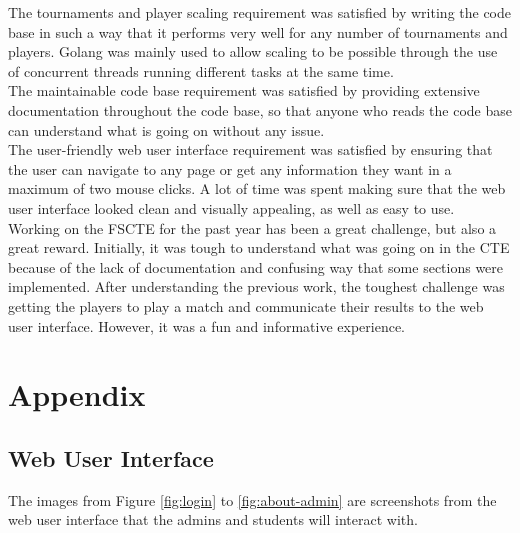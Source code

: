 \documentclass[a4paper, 12pt]{report}
\begin{document}
The tournaments and player scaling requirement was satisfied by writing the
code base in such a way that it performs very well for any number of tournaments
and players. Golang was mainly used to allow scaling to be possible through the
use of concurrent threads running different tasks at the same time. \\

The maintainable code base requirement was satisfied by providing extensive
documentation throughout the code base, so that anyone who reads the code base
can understand what is going on without any issue. \\

The user-friendly web user interface requirement was satisfied by ensuring that
the user can navigate to any page or get any information they want in a maximum
of two mouse clicks. A lot of time was spent making sure that the web user
interface looked clean and visually appealing, as well as easy to use. \\

Working on the FSCTE for the past year has been a great challenge, but also a
great reward. Initially, it was tough to understand what was going on in the CTE
because of the lack of documentation and confusing way that some sections were
implemented. After understanding the previous work, the toughest challenge was
getting the players to play a match and communicate their results to the web
user interface. However, it was a fun and informative experience.

\chapter{Appendix}

\section{Web User Interface}

The images from Figure \ref{fig:login} to \ref{fig:about-admin} are screenshots
from the web user interface that the admins and students will interact with.
\vspace{0.4cm}
\end{document}
